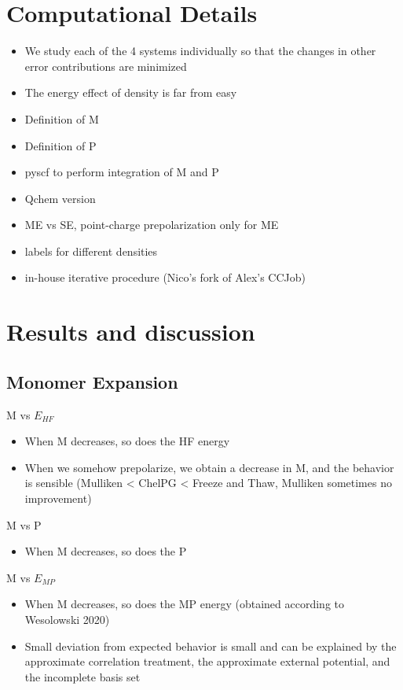 \documentclass[journal=jctcce,manuscript=article, layout=twocolumn]{achemso}
\begin{document}
\section{Computational Details}
\begin{itemize}
 \item We study each of the 4 systems individually so that the changes in other error contributions are minimized
 \item The energy effect of density is far from easy
 \item Definition of M
 \item Definition of P
 \item pyscf to perform integration of M and P
 \item Qchem version
 \item ME vs SE, point-charge prepolarization only for ME
 \item labels for different densities
 \item in-house iterative procedure (Nico's fork of Alex's CCJob)
\end{itemize}

\section{Results and discussion}
\subsection{Monomer Expansion}
M vs $E_{HF}$
\begin{itemize}
 \item When M decreases, so does the HF energy
 \item When we somehow prepolarize, we obtain a decrease in M, and the behavior is sensible (Mulliken < ChelPG < Freeze and Thaw, Mulliken sometimes no improvement)
\end{itemize}
M vs P
\begin{itemize}
 \item When M decreases, so does the P
\end{itemize}
M vs $E_{MP}$
\begin{itemize}
 \item When M decreases, so does the MP energy (obtained according to Wesolowski 2020)
 \item Small deviation from expected behavior is small and can be explained by the approximate correlation treatment, the approximate external potential, and the incomplete basis set
\end{itemize}
\end{document}
